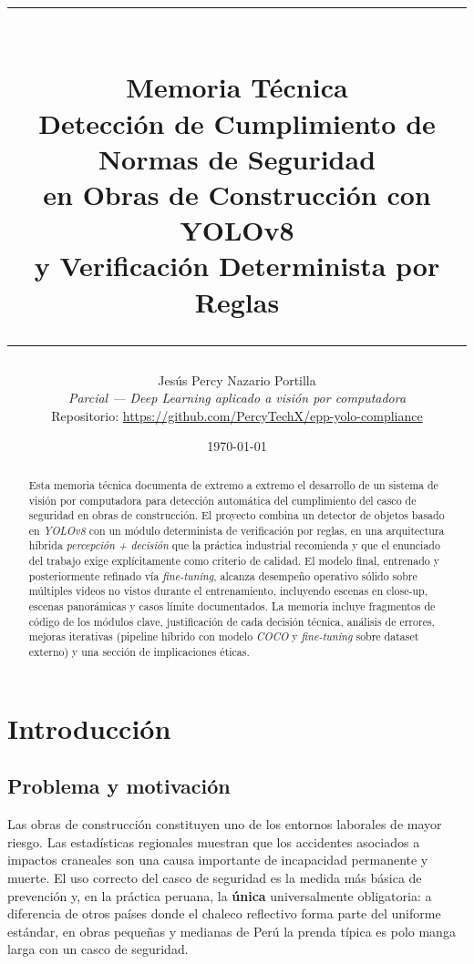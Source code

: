 \documentclass[11pt,a4paper]{article}
\title{
    \vspace{-2cm}
    \rule{\linewidth}{0.5pt}\\[0.5cm]
    {\Huge \bfseries Memoria Técnica}\\[0.3cm]
    {\Large Detección de Cumplimiento de Normas de Seguridad\\ en Obras de Construcción con YOLOv8\\ y Verificación Determinista por Reglas}\\[0.3cm]
    \rule{\linewidth}{0.5pt}
}
\author{Jesús Percy Nazario Portilla\\
\small\textit{Parcial — Deep Learning aplicado a visión por computadora}\\
\small Repositorio: \url{https://github.com/PercyTechX/epp-yolo-compliance}}
\date{\today}
\begin{document}
\maketitle
\thispagestyle{empty}

\vfill

\begin{abstract}
\noindent Esta memoria técnica documenta de extremo a extremo el desarrollo
de un sistema de visión por computadora para detección automática del
cumplimiento del casco de seguridad en obras de construcción. El proyecto
combina un detector de objetos basado en \textit{YOLOv8} con un módulo
determinista de verificación por reglas, en una arquitectura híbrida
\textit{percepción + decisión} que la práctica industrial recomienda y
que el enunciado del trabajo exige explícitamente como criterio de
calidad. El modelo final, entrenado y posteriormente refinado vía
\textit{fine-tuning}, alcanza desempeño operativo sólido sobre múltiples
videos no vistos durante el entrenamiento, incluyendo escenas en
close-up, escenas panorámicas y casos límite documentados. La memoria
incluye fragmentos de código de los módulos clave, justificación de cada
decisión técnica, análisis de errores, mejoras iterativas (pipeline
híbrido con modelo \textit{COCO} y \textit{fine-tuning} sobre dataset
externo) y una sección de implicaciones éticas.
\end{abstract}

\vfill

\newpage
\tableofcontents
\newpage

\section{Introducción}

\subsection{Problema y motivación}

Las obras de construcción constituyen uno de los entornos laborales de
mayor riesgo. Las estadísticas regionales muestran que los accidentes
asociados a impactos craneales son una causa importante de incapacidad
permanente y muerte. El uso correcto del casco de seguridad es la medida
más básica de prevención y, en la práctica peruana, la \textbf{única}
universalmente obligatoria: a diferencia de otros países donde el
chaleco reflectivo forma parte del uniforme estándar, en obras pequeñas
y medianas de Perú la prenda típica es polo manga larga con un casco
de seguridad.
\end{document}

